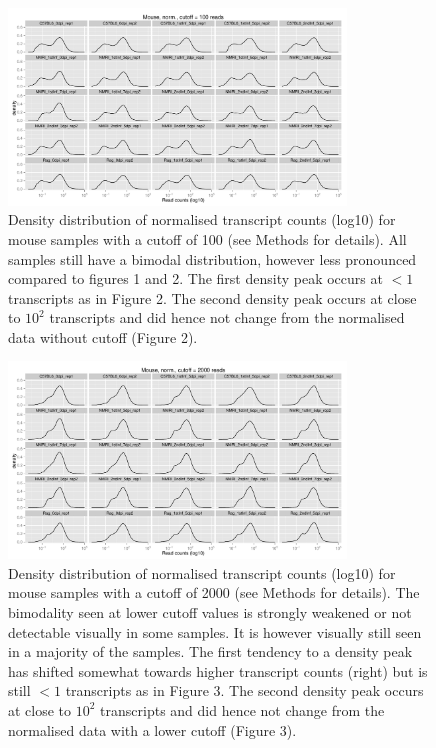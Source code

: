\documentclass{article}
\begin{document}
\begin{figure}[h]
\begin{center}
\includegraphics[width=0.8\textwidth]{distributions_normmouse100} 
\caption{Density distribution of normalised transcript counts (log10)
  for mouse samples with a cutoff of 100 (see Methods for
  details). All samples still have a bimodal distribution, however
  less pronounced compared to figures 1 and 2. The first density peak
  occurs at $<1$ transcripts as in Figure 2. The second density peak
  occurs at close to $10^2$ transcripts and did hence not change from
  the normalised data without cutoff (Figure 2).}
\end{center}
\end{figure}

\begin{figure}[h]
\begin{center}
\includegraphics[width=0.8\textwidth]{distributions_normmouse2000} 
\caption{Density distribution of normalised transcript counts (log10)
  for mouse samples with a cutoff of 2000 (see Methods for
  details). The bimodality seen at lower cutoff values is strongly
  weakened or not detectable visually in some samples. It is however
  visually still seen in a majority of the samples. The first tendency
  to a density peak has shifted somewhat towards higher transcript
  counts (right) but is still $<1$ transcripts as in Figure 3. The
  second density peak occurs at close to $10^2$ transcripts and did
  hence not change from the normalised data with a lower cutoff
  (Figure 3).}
\end{center}
\end{figure}
\end{document}
